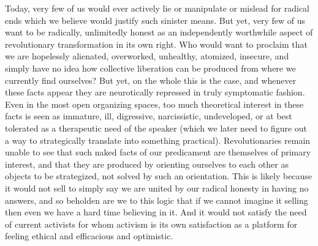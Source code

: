 \documentclass[a4paper,12pt,margin=.5in]{article}
\begin{document}
Today, very few of us would ever actively lie or manipulate or mislead
for radical ends which we believe would justify such sinister means. But
yet, very few of us want to be radically, unlimitedly honest as an
independently worthwhile aspect of revolutionary transformation in its
own right. Who would want to proclaim that we are hopelessly alienated,
overworked, unhealthy, atomized, insecure, and simply have no idea how
collective liberation can be produced from where we currently find
ourselves? But yet, on the whole this is the case, and whenever these
facts appear they are neurotically repressed in truly symptomatic
fashion. Even in the most open organizing spaces, too much theoretical
interest in these facts is seen as immature, ill, digressive,
narcissistic, undeveloped, or at best tolerated as a therapeutic need of
the speaker (which we later need to figure out a way to strategically
translate into something practical). Revolutionaries remain unable to
see that such naked facts of our predicament are themselves of primary
interest, and that they are produced by orienting ourselves to each
other as objects to be strategized, not solved by such an orientation.
This is likely because it would not sell to simply say we are united by
our radical honesty in having no answers, and so beholden are we to this
logic that if we cannot imagine it selling then even we have a hard time
believing in it. And it would not satisfy the need of current activists
for whom activism is its own satisfaction as a platform for feeling
ethical and efficacious and optimistic.
\end{document}
